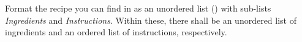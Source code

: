 Format the recipe you can find in  as an 
unordered list () with sub-lists \emph{Ingredients} 
and \emph{Instructions}. 
Within these, there shall be an unordered list of ingredients and an ordered list of 
instructions, respectively.

